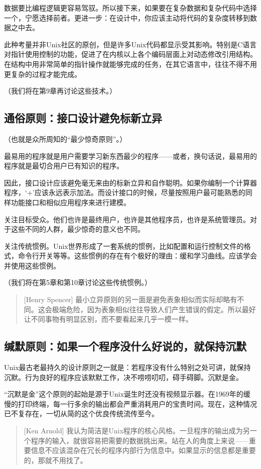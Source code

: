 \documentclass[12pt,oneside]{book}
\begin{document}
\begin{common-format}
数据要比编程逻辑更容易驾驭。所以接下来，如果要在复杂数据和复杂代码中选择一个，宁愿选择前者。更进一步：在设计中，你应该主动将代码的复杂度转移到数据之中去。

此种考量并非Unix社区的原创，但是许多Unix代码都显示受其影响。特别是C语言对指针使用控制的功能，促进了在内核以上各个编码层面上对动态修改引用结构。在结构中用非常简单的指针操作就能够完成的任务，在其它语言中，往往不得不用更复杂的过程才能完成。

（我们将在第9章再讨论这些技术。）

\subsection{通俗原则：接口设计避免标新立异}
（也就是众所周知的“最少惊奇原则”。）

最易用的程序就是用户需要学习新东西最少的程序——或者，换句话说，最易用的程序就是最切合用户已有知识的程序。

因此，接口设计应该避免毫无来由的标新立异和自作聪明。如果你编制一个计算器程序，‘+’应该永远表示加法。而设计接口的时候，尽量按照用户最可能熟悉的同样功能接口和相似应用程序来进行建模。

关注目标受众。他们也许是最终用户，也许是其他程序员，也许是系统管理员。对于这些不同的人群，最少惊奇的意义也不同。

关注传统惯例。Unix世界形成了一套系统的惯例，比如配置和运行控制文件的格式，命令行开关等等。这些惯例的存在有个极好的理由：缓和学习曲线。应该学会并使用这些惯例。

（我们将在第5章和第10章讨论这些传统惯例。）

\begin{quote}[Henry Spencer]
最小立异原则的另一面是避免表象相似而实际却略有不同。这会极端危险，因为表象相似往往导致人们产生错误的假定。所以最好让不同事物有明显区别，而不要看起来几乎一模一样。
\end{quote}


\subsection{缄默原则：如果一个程序没什么好说的，就保持沉默}
Unix最古老最持久的设计原则之一就是：若程序没有什么特别之处可讲，就保持沉默。行为良好的程序应该默默工作，决不唠唠叨叨，碍手碍脚。沉默是金。

“沉默是金”这个原则的起始是源于Unix诞生时还没有视频显示器。在1969年的缓慢的打印终端，每一行多余的输出都会严重消耗用户的宝贵时间。现在，这种情况已不复存在，一切从简的这个优良传统流传至今。

\begin{quote}[Ken Arnold]
我认为简洁是Unix程序的核心风格。一旦程序的输出成为另一个程序的输入，就很容易把需要的数据挑出来。站在人的角度上来说——重要信息不应该混杂在冗长的程序内部行为信息中。如果显示的信息都是重要的，那就不用找了。
\end{quote}


\end{common-format}
\end{document}
